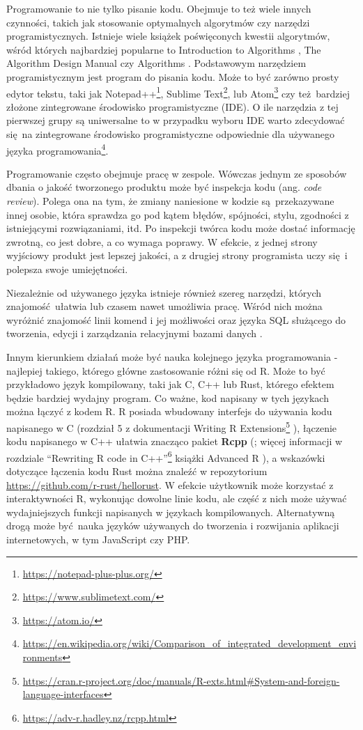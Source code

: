 \documentclass[paper=6in:9in,pagesize=pdftex,headinclude=on,footinclude=on,10pt]{scrbook}
\DeclareRobustCommand{\href}[2]{#2\footnote{\url{#1}}}
\begin{document}
Programowanie to nie tylko pisanie kodu.
Obejmuje to też wiele innych czynności, takich jak stosowanie optymalnych algorytmów czy narzędzi programistycznych.
Istnieje wiele książek poświęconych kwestii algorytmów, wśród których najbardziej popularne to Introduction to Algorithms \citep{cormen2009introduction}, The Algorithm Design Manual \citep{skienaAlgorithmDesignManual2008} czy Algorithms \citep{032157351X}.
Podstawowym narzędziem programistycznym jest program do pisania kodu.
Może to być zarówno prosty edytor tekstu, taki jak \href{https://notepad-plus-plus.org/}{Notepad++}, \href{https://www.sublimetext.com/}{Sublime Text}, lub \href{https://atom.io/}{Atom} czy też~bardziej złożone zintegrowane środowisko programistyczne (IDE).
O ile narzędzia z tej pierwszej grupy są uniwersalne to w przypadku wyboru IDE warto zdecydować się~na zintegrowane środowisko programistyczne odpowiednie dla używanego języka programowania\footnote{\url{https://en.wikipedia.org/wiki/Comparison_of_integrated_development_environments}}.

Programowanie często obejmuje pracę w zespole.
Wówczas jednym ze sposobów dbania o jakość tworzonego produktu może być inspekcja kodu (ang. \emph{code review}).
Polega ona na tym, że zmiany naniesione w kodzie są~przekazywane innej osobie, która sprawdza go pod kątem błędów, spójności, stylu, zgodności z istniejącymi rozwiązaniami, itd.
Po inspekcji twórca kodu może dostać informację zwrotną, co jest dobre, a co wymaga poprawy.
W efekcie, z jednej strony wyjściowy produkt jest lepszej jakości, a z drugiej strony programista uczy się~i polepsza swoje umiejętności.

Niezależnie od używanego języka istnieje również szereg narzędzi, których znajomość~ułatwia lub czasem nawet umożliwia pracę.
Wśród nich można wyróżnić znajomość linii komend i jej możliwości \citep{krossUnixWorkbench2017} oraz języka SQL służącego do tworzenia, edycji i zarządzania relacyjnymi bazami danych \citep{beighley2007head, forta2013sams}.

Innym kierunkiem działań może być nauka kolejnego języka programowania - najlepiej takiego, którego główne zastosowanie różni się od R.
Może to być przykładowo język kompilowany, taki jak C, C++ lub Rust, którego efektem będzie bardziej wydajny program.
Co ważne, kod napisany w tych językach można łączyć z kodem R.
R posiada wbudowany interfejs do używania kodu napisanego w C (rozdział 5 z dokumentacji \href{https://cran.r-project.org/doc/manuals/R-exts.html\#System-and-foreign-language-interfaces}{Writing R Extensions} \citep{team1999writing}), łączenie kodu napisanego w C++ ułatwia znacząco pakiet \textbf{Rcpp} (\citet{R-Rcpp}; więcej informacji w rozdziale \href{https://adv-r.hadley.nz/rcpp.html}{``Rewriting R code in C++''} książki Advanced R \citep{wickham2014advanced}), a wskazówki dotyczące łączenia kodu Rust można znaleźć w repozytorium \url{https://github.com/r-rust/hellorust}.
W efekcie użytkownik może korzystać z interaktywności R, wykonując dowolne linie kodu, ale część z nich może używać wydajniejszych funkcji napisanych w językach kompilowanych.
Alternatywną drogą może być~nauka języków używanych do tworzenia i rozwijania aplikacji internetowych, w tym JavaScript czy PHP.
\end{document}
